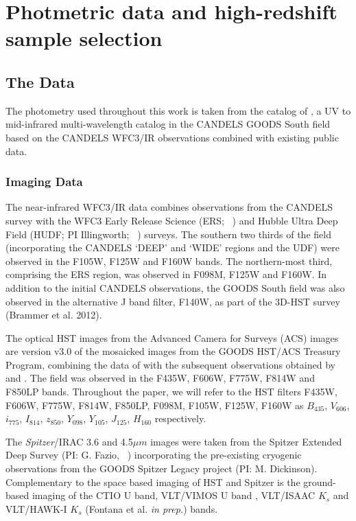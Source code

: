 
\chapter[Data and Sample Selection]{Photmetric data and high-redshift sample selection} 
\label{ch:chapter1_label}

\section{The Data}\label{sec:data}
The photometry used throughout this work is taken from the catalog of \citet{Guo:2013ig}, a UV to mid-infrared multi-wavelength catalog in the CANDELS GOODS South field based on the CANDELS WFC3/IR observations combined with existing public data.

\subsection{Imaging Data}
The near-infrared WFC3/IR data combines observations from the CANDELS survey \citep{2011ApJS..197...35G,Koekemoer:2011br} with the WFC3 Early Release Science (ERS; \citeauthor{2011ApJS..193...27W}~\citeyear{2011ApJS..193...27W}) and Hubble Ultra Deep Field (HUDF; PI Illingworth; \citeauthor{Bouwens:2010dk}~\citeyear{Bouwens:2010dk}) surveys. The southern two thirds of the field (incorporating the CANDELS `DEEP' and `WIDE' regions and the UDF) were observed in the F105W, F125W and F160W bands. The northern-most third, comprising the ERS region, was observed in F098M, F125W and F160W. In addition to the initial CANDELS observations, the GOODS South field was also observed in the alternative J band filter, F140W, as part of the 3D-HST survey (Brammer et al. 2012).

The optical HST images from the Advanced Camera for Surveys (ACS) images are version v3.0 of the mosaicked images from the GOODS HST/ACS Treasury Program, combining the data of \citet{2004ApJ...600L..93G} with the subsequent observations obtained by \citet{2006AJ....132.1729B} and \citep{Koekemoer:2011br}. The field was observed in the F435W, F606W, F775W, F814W and F850LP bands. Throughout the paper, we will refer to the HST filters F435W, F606W, F775W, F814W, F850LP, F098M, F105W, F125W, F160W as $B_{435}$, $V_{606}$, $i_{775}$, $I_{814}$, $z_{850}$, $Y_{098}$, $Y_{105}$, $J_{125}$, $H_{160}$ respectively. 

The \emph{Spitzer}/IRAC \citep{Fazio:2004eb} 3.6 and 4.5$\mu m$ images were taken from the Spitzer Extended Deep Survey (PI: G. Fazio, \citeauthor{Ashby:2013cc}~\citeyear{Ashby:2013cc}) incorporating the pre-existing cryogenic observations from the GOODS Spitzer Legacy project (PI: M. Dickinson). Complementary to the space based imaging of HST and Spitzer is the ground-based imaging of the CTIO U band, VLT/VIMOS U band \citep{Nonino:2009hf}, VLT/ISAAC $K_{s}$ \citep{Retzlaff:2010co} and VLT/HAWK-I $K_{s}$ (Fontana et al. \emph{in prep.}) bands.

